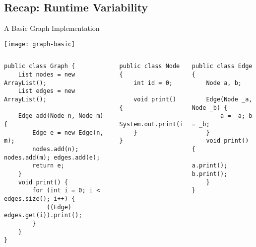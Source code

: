\subsection{Recap: Runtime Variability}
\begin{frame}{\myframetitle}
\end{frame}

\begin{frame}[fragile]{A Basic Graph Implementation}
	\vspace{-1.5cm}
	\begin{flushright}
		\texttt{[image: graph-basic]}
	\end{flushright}
	\vspace{0.1cm}
	\begin{tiny}
		\begin{columns}
\begin{lstlisting}
public class Graph {
	List nodes = new ArrayList();
	List edges = new ArrayList();

	Edge add(Node n, Node m) {
		Edge e = new Edge(n, m);
		nodes.add(n); nodes.add(m); edges.add(e);
		return e;
	}
	void print() {
		for (int i = 0; i < edges.size(); i++) {
			((Edge) edges.get(i)).print();
		}
	}
}
\end{lstlisting}
\begin{lstlisting}
public class Node {
	int id = 0;

	void print() {
		System.out.print(id);
	}
}
\end{lstlisting}
\begin{lstlisting}
public class Edge {
	Node a, b;

	Edge(Node _a, Node _b) {
		a = _a; b = _b;
	}
	void print() {
		a.print(); b.print();
	}
}
\end{lstlisting}
		\end{columns}
	\end{tiny}
\end{frame}

